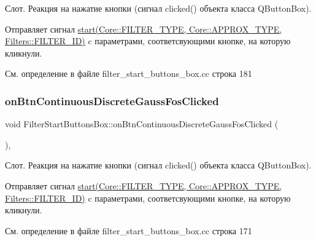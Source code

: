 Слот. Реакция на нажатие кнопки (сигнал clicked() объекта класса Q\+Button\+Box).

Отправляет сигнал \hyperlink{class_filter_start_buttons_box_ac6e2a6555f1d388391f188f834b8e753}{start(\+Core\+::\+F\+I\+L\+T\+E\+R\+\_\+\+T\+Y\+P\+E, Core\+::\+A\+P\+P\+R\+O\+X\+\_\+\+T\+Y\+P\+E, Filters\+::\+F\+I\+L\+T\+E\+R\+\_\+\+I\+D)} c параметрами, соответсвующими кнопке, на которую кликнули. 

См. определение в файле filter\+\_\+start\+\_\+buttons\+\_\+box.\+cc строка 181

\hypertarget{class_filter_start_buttons_box_a165d56507e4ed134260bbe37bf9fd858}{}\label{class_filter_start_buttons_box_a165d56507e4ed134260bbe37bf9fd858} 
\subsubsection{\texorpdfstring{on\+Btn\+Continuous\+Discrete\+Gauss\+Fos\+Clicked}{onBtnContinuousDiscreteGaussFosClicked}}
{\footnotesize\ttfamily void Filter\+Start\+Buttons\+Box\+::on\+Btn\+Continuous\+Discrete\+Gauss\+Fos\+Clicked (\begin{DoxyParamCaption}{ }\end{DoxyParamCaption})\hspace{0.3cm}{\ttfamily [private]}, {\ttfamily [slot]}}

Слот. Реакция на нажатие кнопки (сигнал clicked() объекта класса Q\+Button\+Box).

Отправляет сигнал \hyperlink{class_filter_start_buttons_box_ac6e2a6555f1d388391f188f834b8e753}{start(\+Core\+::\+F\+I\+L\+T\+E\+R\+\_\+\+T\+Y\+P\+E, Core\+::\+A\+P\+P\+R\+O\+X\+\_\+\+T\+Y\+P\+E, Filters\+::\+F\+I\+L\+T\+E\+R\+\_\+\+I\+D)} c параметрами, соответсвующими кнопке, на которую кликнули. 

См. определение в файле filter\+\_\+start\+\_\+buttons\+\_\+box.\+cc строка 171

\hypertarget{class_filter_start_buttons_box_ae9d6e1bec50f96b2377e2a85bb4e73ca}{}\label{class_filter_start_buttons_box_ae9d6e1bec50f96b2377e2a85bb4e73ca} 
